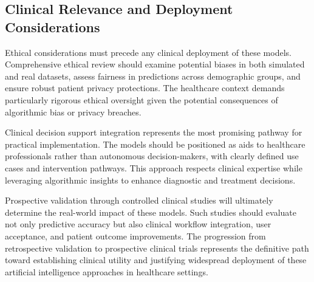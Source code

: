 \subsection{Clinical Relevance and Deployment Considerations}

Ethical considerations must precede any clinical deployment of these models. Comprehensive ethical review should examine potential biases in both simulated and real datasets, assess fairness in predictions across demographic groups, and ensure robust patient privacy protections. The healthcare context demands particularly rigorous ethical oversight given the potential consequences of algorithmic bias or privacy breaches.

Clinical decision support integration represents the most promising pathway for practical implementation. The models should be positioned as aids to healthcare professionals rather than autonomous decision-makers, with clearly defined use cases and intervention pathways. This approach respects clinical expertise while leveraging algorithmic insights to enhance diagnostic and treatment decisions.

Prospective validation through controlled clinical studies will ultimately determine the real-world impact of these models. Such studies should evaluate not only predictive accuracy but also clinical workflow integration, user acceptance, and patient outcome improvements. The progression from retrospective validation to prospective clinical trials represents the definitive path toward establishing clinical utility and justifying widespread deployment of these artificial intelligence approaches in healthcare settings.